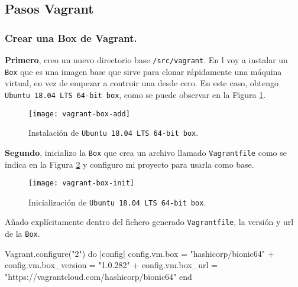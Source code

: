 
\subsection{Pasos Vagrant}


\subsubsection{Crear una Box de Vagrant.}
\par \textbf{Primero}, creo un nuevo directorio base \texttt{/src/vagrant}.
En l voy a instalar un \texttt{Box} que es una imagen base que 
sirve para clonar rápidamente una máquina virtual, en vez 
de empezar a contruir una desde cero. En este caso, obtengo 
\texttt{Ubuntu 18.04 LTS 64-bit box}, como se puede observar
en la Figura \ref{fig:vagrant-box-add}.

\begin{figure}[H]
    \texttt{[image: vagrant-box-add]}
    \centering
    \caption{Instalación de \texttt{Ubuntu 18.04 LTS 64-bit box}.}
    \label{fig:vagrant-box-add}
 \end{figure}
\par \textbf{Segundo}, inicializo la \texttt{Box} que crea un archivo llamado \texttt{Vagrantfile} como 
se indica en la Figura \ref{fig:vagrant-box-init} y configuro mi proyecto para usarla como base.
\begin{figure}[H]
    \texttt{[image: vagrant-box-init]}
    \centering
    \caption{Inicialización de \texttt{Ubuntu 18.04 LTS 64-bit box}.}
    \label{fig:vagrant-box-init}
 \end{figure}
 \par Añado explícitamente dentro del fichero generado \texttt{Vagrantfile}, la versión y url de la \texttt{Box}.
 \begin{listing}
    Vagrant.configure("2") do |config|
        config.vm.box = "hashicorp/bionic64"
  +     config.vm.box_version = "1.0.282"
  +     config.vm.box_url = "https://vagrantcloud.com/hashicorp/bionic64"
    end
 \end{listing}


